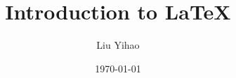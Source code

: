 \documentclass{beamer}
\title{Introduction to \LaTeX}
\author{Liu Yihao}
\date{\today}
\institute{SJTU-UMJI}
\begin{document}
\begin{frame}
	\titlepage	
\end{frame}














\end{document}
